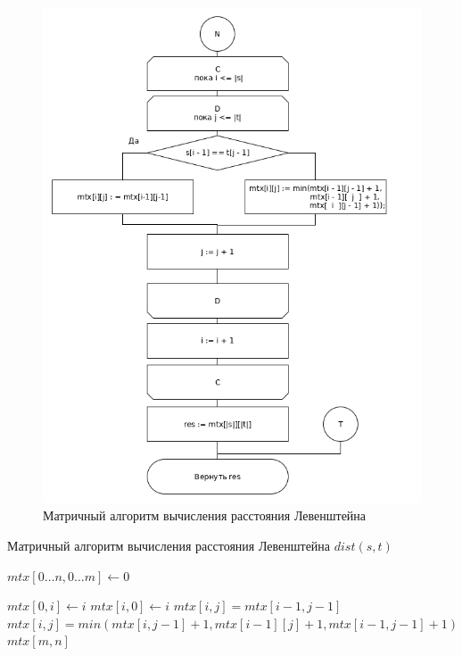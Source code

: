 \documentclass[a4paper,12pt]{article}
\begin{document}
		 		\begin{figure}[h]
		 			\centering
		 			{
		 				\includegraphics[scale=0.51]{lm2.png}
		 				\caption{Матричный алгоритм вычисления расстояния Левенштейна}
		 				\label{ris:matr_lev_sh2}
		 			}
		 		\end{figure}	
	\begin{algorithm}
		\caption{Матричный алгоритм вычисления расстояния Левенштейна $dist(s, t)$}
		\begin{algorithmic}
			\State $mtx [0 \dots n, 0 \dots m] \gets 0$
			
				\State $mtx[0, i] \gets i$
			\EndFor
				\State $mtx[i, 0] \gets i$
			\EndFor
			\State
						\State $mtx[i, j] = mtx[i-1, j-1]$
					\Else
						\State $mtx[i, j] = min(mtx[i,j-1]+1, mtx[i-1][j]+1,mtx[i-1,j-1]+1)$
					\EndIf
				\EndFor
			\EndFor
			\State \Return $mtx[m, n]$
				
		\end{algorithmic}
	\end{algorithm}
    \newpage	
    
\end{document}
